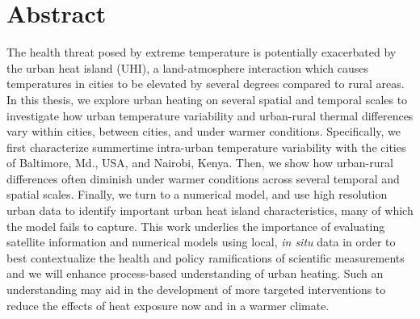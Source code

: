 \chapter*{Abstract}

The health threat posed by extreme temperature is potentially exacerbated by the urban heat island (UHI), a land-atmosphere interaction which causes temperatures in cities to be elevated by several degrees compared to rural areas. 
In this thesis, we explore urban heating on several spatial and temporal scales to investigate how urban temperature variability and urban-rural thermal differences vary within cities, between cities, and under warmer conditions. 
 Specifically, we first characterize summertime intra-urban temperature variability with the cities of Baltimore, Md., USA, and Nairobi, Kenya. Then, we show how urban-rural differences often diminish under warmer conditions across several temporal and spatial scales. 
 Finally, we turn to a numerical model, and use high resolution urban data to identify important urban heat island characteristics, many of which the model fails to capture.  
 This work underlies the importance of evaluating satellite information and numerical models using local, \textit{in situ} data in order to best contextualize the health and policy ramifications of scientific measurements and we will enhance process-based understanding of urban heating. 
Such an understanding may aid in the development of more targeted interventions to reduce the effects of heat exposure now and in a warmer climate.